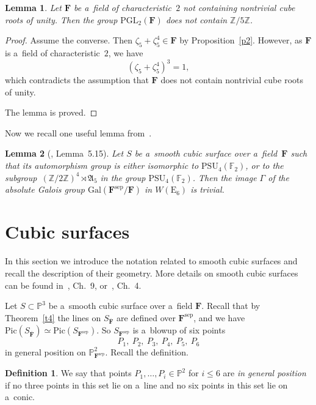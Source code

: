 \documentclass{amsart}
\numberwithin{equation}{section}
\theoremstyle{plain}
\newtheorem{lemma}{Lemma}
\theoremstyle{definition}
\newtheorem{definition}{Definition}
\theoremstyle{remark}
\begin{document}
\begin{lemma}
\label{l10}
Let $\mathbf{F}$ be a~field of characteristic~$2$ not containing nontrivial cube roots of unity. Then the group $\mathrm{PGL}_2(\mathbf{F})$ does not contain $\mathbb{Z}/5\mathbb{Z}$.
\end{lemma}

\begin{proof}
Assume the converse. Then $\zeta_5+\zeta_5^4 \in \mathbf{F}$ by Proposition~\ref{p2}. However, as $\mathbf{F}$
 is a~field of characteristic~$2$, we have
$$
(\zeta_5+\zeta_5^4)^3=1,
$$
which contradicts the assumption that $\mathbf{F}$ does not contain nontrivial cube roots of unity.

The lemma is proved.
\end{proof}

Now we recall one useful lemma from~\cite{18}.

\begin{lemma}[{\cite{18}, Lemma~5.15}]
\label{l11}
Let $S$ be a~smooth cubic surface over a~field~$\mathbf{F}$ such that its automorphism group is
either isomorphic to $\mathrm{PSU}_4(\mathbb{F}_2)$, or to the subgroup~\mbox{$(\mathbb{Z}/2\mathbb{Z})^4 \rtimes \mathfrak{A}_5$} in the group $\mathrm{PSU}_4(\mathbb{F}_2)$.
Then the image $\Gamma$ of the absolute Galois group $\mathrm{Gal}(\mathbf{F}^{\mathrm{sep}}/\mathbf{F})$ in $W(\mathrm{E}_6)$ is trivial.
\end{lemma}


\section{Cubic surfaces}
\label{s3}

In this section we introduce the notation related to smooth cubic surfaces and recall the description of their geometry. More details on smooth cubic surfaces can be found in~\cite{7}, Ch.~9, or~\cite{14}, Ch.~4.

Let $S \subset \mathbb{P}^3$ be a~smooth cubic surface over a~field $\mathbf{F}$. Recall that by Theorem~\ref{t4} the lines on $S_{\overline{\mathbf{F}}}$ are defined over $\mathbf{F}^{\mathrm{sep}}$, and we have $\mathrm{Pic}(S_{\overline{\mathbf{F}}}) \simeq \mathrm{Pic}(S_{\mathbf{F}^{\mathrm{sep}}})$. So $S_{\mathbf{F}^{\mathrm{sep}}}$ is a~blowup of six points
$$
P_1, \ P_2, \ P_3, \ P_4, \ P_5, \ P_6
$$
in general position on $\mathbb{P}^2_{\mathbf{F}^{\mathrm{sep}}}$. Recall the definition.

\begin{definition}
\label{d1}
We say that points $P_1,\dots, P_i \in \mathbb{P}^2$ for $i \leqslant 6$ are \textit{in general position} if no three points in this set lie on a~line and no six points in this set lie on a~conic.
\end{definition}
\end{document}
